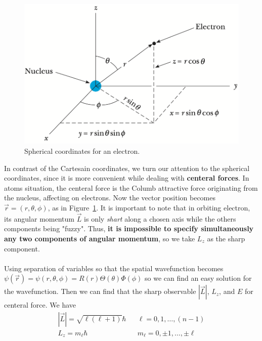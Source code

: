 \documentclass[twocolumn]{article}
\begin{document}
        \paragraph{}
        \begin{figure}
            \includegraphics[width=0.9\linewidth]{figures/spherical-coordinates}
            \caption{Spherical coordinates for an electron.}
            \label{fig:spherical coordinates}
        \end{figure}

        In contrast of the Cartesain coordinates, we turn our attention to the spherical coordinates,
        since it is more convenient while dealing with \textbf{centeral forces}. In atoms situation,
        the centeral force is the Columb attractive force originating from the nucleus, affecting on
        electrons. Now the vector position becomes $\vec{r} = (r, \theta, \phi)$, as in Figure~\ref{fig:spherical coordinates}. It is important to
        note that in orbiting electron, its angular momentum $\vec{L}$ is only \emph{shart} along 
        a chosen axis while the others components being "fuzzy". Thus, \textbf{it is impossible to
        specify simultaneously any two components of angular momentum}, so we take $L_z$ as the sharp
        component.



        \paragraph{} Using separation of variables so that the spatial wavefunction becomes 
        $\psi(\vec{r}) = \psi(r, \theta, \phi) = R(r)\Theta(\theta)\Phi(\phi)$ so we can find an 
        easy solution for the wavefunction. Then we can find that the sharp observable $|\vec{L}|$, $L_z$, 
        and $E$ for centeral force. We have
        \begin{align*}
            |\vec{L}| = \sqrt{\ell(\ell+1)} \hbar && \ell = 0, 1,\dots, (n-1) \\
            L_z = m_\ell \hbar && m_\ell = 0, \pm 1, \dots, \pm \ell
        \end{align*}
        
\end{document}
